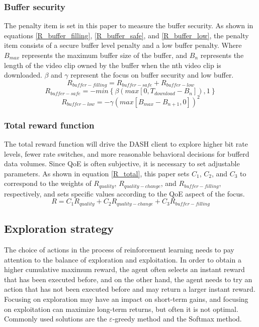 \documentclass[twocolumn]{article}
\begin{document}
\subsubsection{Buffer security}
The penalty item is set in this paper to measure the buffer security. 
As shown in equations \ref{R_buffer_filling}, \ref{R_buffer_safe}, and \ref{R_buffer_low}, 
the penalty item consists of a secure buffer level penalty and a low buffer penalty.
 Where $B_{max}$ represents the maximum buffer size of the buffer, and $B_{n}$ represents the 
 length of the video clip owned by the buffer when the nth video clip is downloaded. 
 $\beta$ and $\gamma$ represent the focus on buffer security and low buffer.
\begin{equation}
\label{R_buffer_filling}
R_{buffer-filling}=R_{buffer-safe}+R_{buffer-low}
\end{equation}
\begin{equation}
\label{R_buffer_safe}
R_{buffer-safe}=-min\left\{\beta\left(max\left[0,T_{download}-B_{n}\right]\right),1\right\}
\end{equation}
\begin{equation}
\label{R_buffer_low}
R_{buffer-low}=-\gamma\left(max\left[B_{max}-B_{n+1},0\right]\right)^2
\end{equation}
\subsubsection{Total reward function}
The total reward function will drive the DASH client to explore higher bit rate levels, 
fewer rate switches, and more reasonable behavioral decisions for bufferd data volumes.
 Since QoE is often subjective, it is necessary to set adjustable parameters.
 As shown in equation \ref{R_total}, this paper sets $C_{1}$, $C_{2}$, and $C_{3}$ to 
 correspond to the weights of $R_{quality}$, $R_{quality-change}$, and $R_{buffer-filling}$,
  respectively, and sets specific values according to the QoE aspect of the focus.
\begin{equation}
\label{R_total}
R=C_{1}R_{quality}+C_{2}R_{quality-change}+C_{3}R_{buffer-filling}
\end{equation}
\subsection{Exploration strategy}
The choice of actions in the process of reinforcement learning needs to pay attention to the 
balance of exploration and exploitation. In order to obtain a higher cumulative maximum reward, 
the agent often selects an instant reward that has been executed before, 
and on the other hand, the agent needs to try an action that has not been executed before and 
may return a larger instant reward. Focusing on exploration may have an impact on short-term gains,
 and focusing on exploitation can maximize long-term returns, but often it is not optimal.
 Commonly used solutions are the $\varepsilon$-greedy method and the Softmax method\cite{RN18}.
\end{document}
